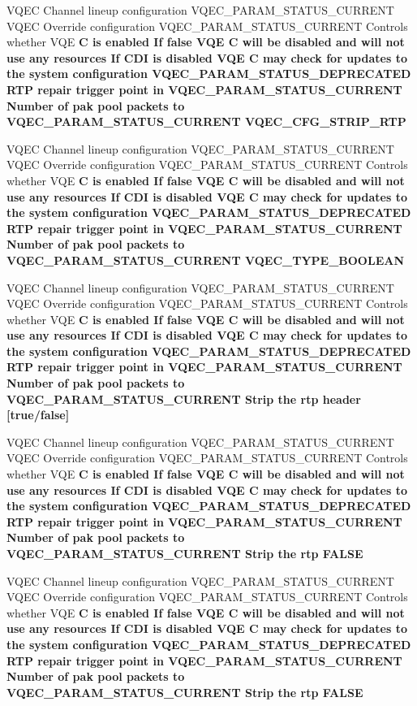 \begin{CompactItemize}
\item 
VQEC Channel lineup configuration VQEC\_\-PARAM\_\-STATUS\_\-CURRENT VQEC Override configuration VQEC\_\-PARAM\_\-STATUS\_\-CURRENT Controls whether VQE \bf{C} is enabled If false VQE \bf{C} will be disabled and will not use any resources If CDI is disabled VQE \bf{C} may check for updates \bf{to} the system configuration VQEC\_\-PARAM\_\-STATUS\_\-DEPRECATED RTP repair trigger point in VQEC\_\-PARAM\_\-STATUS\_\-CURRENT Number of pak pool packets \bf{to} VQEC\_\-PARAM\_\-STATUS\_\-CURRENT \bf{VQEC\_\-CFG\_\-STRIP\_\-RTP}
\item 
VQEC Channel lineup configuration VQEC\_\-PARAM\_\-STATUS\_\-CURRENT VQEC Override configuration VQEC\_\-PARAM\_\-STATUS\_\-CURRENT Controls whether VQE \bf{C} is enabled If false VQE \bf{C} will be disabled and will not use any resources If CDI is disabled VQE \bf{C} may check for updates \bf{to} the system configuration VQEC\_\-PARAM\_\-STATUS\_\-DEPRECATED RTP repair trigger point in VQEC\_\-PARAM\_\-STATUS\_\-CURRENT Number of pak pool packets \bf{to} VQEC\_\-PARAM\_\-STATUS\_\-CURRENT \bf{VQEC\_\-TYPE\_\-BOOLEAN}
\item 
VQEC Channel lineup configuration VQEC\_\-PARAM\_\-STATUS\_\-CURRENT VQEC Override configuration VQEC\_\-PARAM\_\-STATUS\_\-CURRENT Controls whether VQE \bf{C} is enabled If false VQE \bf{C} will be disabled and will not use any resources If CDI is disabled VQE \bf{C} may check for updates \bf{to} the system configuration VQEC\_\-PARAM\_\-STATUS\_\-DEPRECATED RTP repair trigger point in VQEC\_\-PARAM\_\-STATUS\_\-CURRENT Number of pak pool packets \bf{to} VQEC\_\-PARAM\_\-STATUS\_\-CURRENT Strip the rtp \bf{header} [true/false]
\item 
VQEC Channel lineup configuration VQEC\_\-PARAM\_\-STATUS\_\-CURRENT VQEC Override configuration VQEC\_\-PARAM\_\-STATUS\_\-CURRENT Controls whether VQE \bf{C} is enabled If false VQE \bf{C} will be disabled and will not use any resources If CDI is disabled VQE \bf{C} may check for updates \bf{to} the system configuration VQEC\_\-PARAM\_\-STATUS\_\-DEPRECATED RTP repair trigger point in VQEC\_\-PARAM\_\-STATUS\_\-CURRENT Number of pak pool packets \bf{to} VQEC\_\-PARAM\_\-STATUS\_\-CURRENT Strip the rtp \bf{FALSE}
\item 
VQEC Channel lineup configuration VQEC\_\-PARAM\_\-STATUS\_\-CURRENT VQEC Override configuration VQEC\_\-PARAM\_\-STATUS\_\-CURRENT Controls whether VQE \bf{C} is enabled If false VQE \bf{C} will be disabled and will not use any resources If CDI is disabled VQE \bf{C} may check for updates \bf{to} the system configuration VQEC\_\-PARAM\_\-STATUS\_\-DEPRECATED RTP repair trigger point in VQEC\_\-PARAM\_\-STATUS\_\-CURRENT Number of pak pool packets \bf{to} VQEC\_\-PARAM\_\-STATUS\_\-CURRENT Strip the rtp \bf{FALSE}

\end{CompactItemize}
